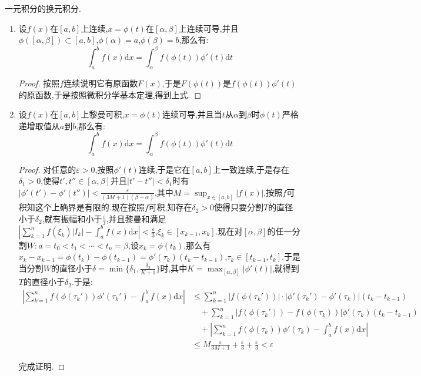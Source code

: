 一元积分的换元积分.
\begin{enumerate}
	\item 设$f(x)$在$[a,b]$上连续,$x=\phi(t)$在$[\alpha,\beta]$上连续可导,并且$\phi([\alpha,\beta])\subset[a,b]$,$\phi(\alpha)=a$,$\phi(\beta)=b$,那么有:
	$$\int_a^bf(x)\mathrm{d}x=\int_{\alpha}^{\beta}f(\phi(t))\phi'(t)\mathrm{d}t$$
	\begin{proof}
		
		按照$f$连续说明它有原函数$F(x)$,于是$F(\phi(t))$是$f(\phi(t))\phi'(t)$的原函数,于是按照微积分学基本定理,得到上式.
		
	\end{proof}
	\item 设$f(x)$在$[a,b]$上黎曼可积,$x=\phi(t)$连续可导,并且当$t$从$\alpha$到$\beta$时$\phi(t)$严格递增取值从$a$到$b$,那么有:
	$$\int_a^bf(x)\mathrm{d}x=\int_{\alpha}^{\beta}f(\phi(t))\phi'(t)\mathrm{d}t$$
	\begin{proof}
		
		对任意的$\varepsilon>0$,按照$\phi'(t)$连续,于是它在$[a,b]$上一致连续,于是存在$\delta_1>0$,使得$t',t''\in[\alpha,\beta]$并且$|t'-t''|<\delta_1$时有$|\phi'(t')-\phi'(t'')|<\frac{\varepsilon}{(3M+1)(\beta-\alpha)}$,其中$M=\sup_{x\in[a,b]}|f(x)|$,按照$f$可积知这个上确界是有限的.现在按照$f$可积,知存在$\delta_2>0$使得只要分割$T$的直径小于$\delta_2$,就有振幅和小于$\frac{\varepsilon}{3}$,并且黎曼和满足$\left|\sum_{k=1}^nf(\xi_k)|I_k|-\int_a^bf(x)\mathrm{d}x\right|<\frac{\varepsilon}{3}$,$\xi_k\in[x_{k-1},x_k]$.现在对$[\alpha,\beta]$的任一分割$W:a=t_0<t_1<\cdots<t_n=\beta$,设$x_k=\phi(t_k)$,那么有$x_k-x_{k-1}=\phi(t_k)-\phi(t_{k-1})=\phi'(\tau_k)(t_k-t_{k-1})$,$\tau_k\in[t_{k-1},t_k]$.于是当分割$W$的直径小于$\delta=\min\{\delta_1,\frac{\delta_2}{K+1}\}$时,其中$K=\max_{[\alpha,\beta]}|\phi'(t)|$,就得到$T$的直径小于$\delta_2$.于是:
		\begin{align*}
		\left|\sum_{k=1}^{n}f(\phi(\tau_k'))\phi'(\tau_k')-\int_a^bf(x)\mathrm{d}x\right| &\le\sum_{k=1}^{n}|f(\phi(\tau_k'))|\cdot|\phi'(\tau_k')-\phi'(\tau_k)|(t_k-t_{k-1})\\
		&\quad +\sum_{k=1}^{n}|f(\phi(\tau_k'))-f(\phi(\tau_k))|\phi'(\tau_k)(t_k-t_{k-1})\\
		&\quad +\left|\sum_{k=1}^{n}f(\phi(\tau_k))\phi'(\tau_k)-\int_a^bf(x)\mathrm{d}x\right|\\
		&\le M\frac{\varepsilon}{3M+1}+\frac{\varepsilon}{3}+\frac{\varepsilon}{3}<\varepsilon
		\end{align*}
		
		完成证明.
	\end{proof}
\end{enumerate}

